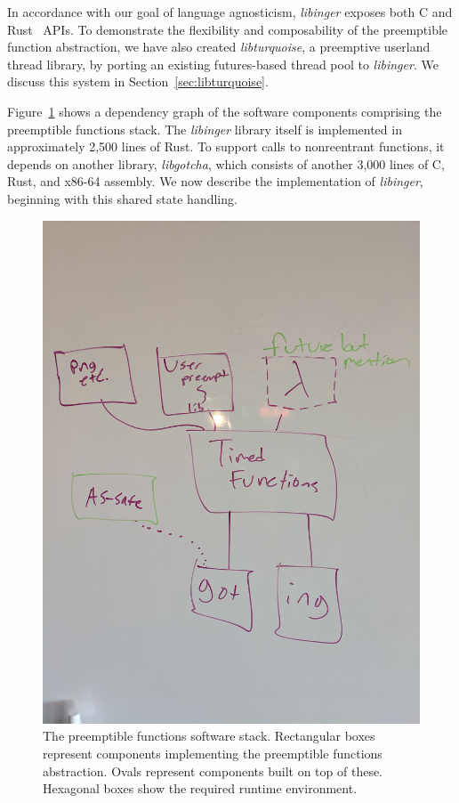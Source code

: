 In accordance with our goal of language agnosticism, \textit{libinger} exposes both C
and Rust~\cite{www-rustlang} APIs.  To demonstrate the flexibility and composability
of the preemptible function abstraction, we have also created \textit{libturquoise},
a preemptive userland thread library, by porting an existing futures-based thread
pool to \textit{libinger}.  We discuss this system in Section~\ref{sec:libturquoise}.

Figure~\ref{fig:architecture} shows a dependency graph of the software components
comprising the preemptible functions stack.  The \textit{libinger} library itself is
implemented in approximately 2,500 lines of Rust.  To support calls to nonreentrant
functions, it depends on another library, \textit{libgotcha}, which consists of
another 3,000 lines of C, Rust, and x86-64 assembly.  We now describe the
implementation of \textit{libinger}, beginning with this shared state handling.

\begin{figure}
\begin{center}
\includegraphics[width=0.75\columnwidth]{figs/architecture}
\end{center}
\caption{The preemptible functions software stack.  \textnormal{Rectangular boxes
represent components implementing the preemptible functions abstraction.  Ovals
represent components built on top of these.  Hexagonal boxes show the
required runtime environment.}}
\label{fig:architecture}
\end{figure}


